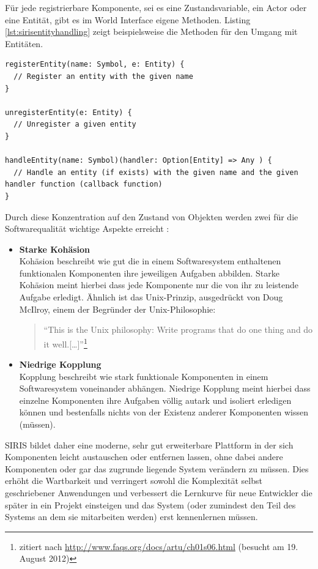 Für jede registrierbare Komponente, sei es eine Zustandsvariable, ein Actor oder eine Entität, gibt es im World Interface eigene Methoden. Listing \ref{lst:sirisentityhandling} zeigt beispielsweise die Methoden für den Umgang mit Entitäten.
\lstset{language=Scala}
\begin{lstlisting}[caption={Methoden zum Registrieren, handlen und deregistrieren von Entitäten}, label={lst:sirisentityhandling}]
registerEntity(name: Symbol, e: Entity) {
  // Register an entity with the given name
}

unregisterEntity(e: Entity) {
  // Unregister a given entity
}

handleEntity(name: Symbol)(handler: Option[Entity] => Any ) {
  // Handle an entity (if exists) with the given name and the given handler function (callback function)
}
\end{lstlisting}
Durch diese Konzentration auf den Zustand von Objekten werden zwei für die Softwarequalität wichtige Aspekte erreicht \autocite[305]{GuruMeditation}:
\begin{itemize}
    \item \textbf{Starke Kohäsion}\\
Kohäsion beschreibt wie gut die in einem Softwaresystem enthaltenen funktionalen Komponenten ihre jeweiligen Aufgaben abbilden. Starke Kohäsion meint hierbei dass jede Komponente nur die von ihr zu leistende Aufgabe erledigt. Ähnlich ist das Unix-Prinzip, ausgedrückt von Doug McIlroy, einem der Begründer der Unix-Philosophie: \begin{quote}"`This is the Unix philosophy: Write programs that do one thing and do it well.[\ldots]"'\footnote{zitiert nach \url{http://www.faqs.org/docs/artu/ch01s06.html} (besucht am 19. August 2012)}\end{quote}
    \item \textbf{Niedrige Kopplung}\\Kopplung beschreibt wie stark funktionale Komponenten in einem Softwaresystem voneinander abhängen. Niedrige Kopplung meint hierbei dass einzelne Komponenten ihre Aufgaben völlig autark und isoliert erledigen können und bestenfalls nichts von der Existenz anderer Komponenten wissen (müssen).
\end{itemize}
SIRIS bildet daher eine moderne, sehr gut erweiterbare Plattform in der sich Komponenten leicht austauschen oder entfernen lassen, ohne dabei andere Komponenten oder gar das zugrunde liegende System verändern zu müssen. Dies erhöht die Wartbarkeit und verringert sowohl die Komplexität selbst geschriebener Anwendungen und verbessert die Lernkurve für neue Entwickler die später in ein Projekt einsteigen und das System (oder zumindest den Teil des Systems an dem sie mitarbeiten werden) erst kennenlernen müssen.
